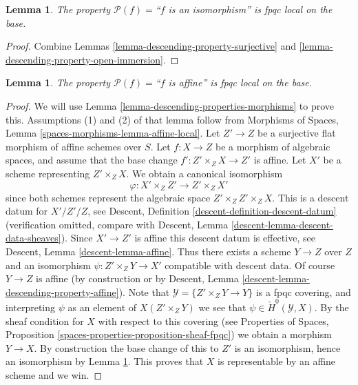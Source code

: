 \documentclass{stacks-project}
\theoremstyle{plain}
\newtheorem{lemma}[subsection]{Lemma}
\theoremstyle{definition}
\theoremstyle{remark}
\numberwithin{equation}{subsection}
\begin{document}
\begin{lemma}
\label{lemma-descending-property-isomorphism}
The property $\mathcal{P}(f) =$``$f$ is an isomorphism''
is fpqc local on the base.
\end{lemma}

\begin{proof}
Combine Lemmas \ref{lemma-descending-property-surjective}
and \ref{lemma-descending-property-open-immersion}.
\end{proof}

\begin{lemma}
\label{lemma-descending-property-affine}
The property $\mathcal{P}(f) =$``$f$ is affine''
is fpqc local on the base.
\end{lemma}

\begin{proof}
We will use
Lemma \ref{lemma-descending-properties-morphisms}
to prove this. Assumptions (1) and (2) of that lemma follow from
Morphisms of Spaces,
Lemma \ref{spaces-morphisms-lemma-affine-local}.
Let $Z' \to Z$ be a surjective flat morphism of affine schemes over $S$.
Let $f : X \to Z$ be a morphism of algebraic spaces, and assume
that the base change $f' : Z' \times_Z X \to Z'$ is affine.
Let $X'$ be a scheme representing $Z' \times_Z X$.
We obtain a canonical isomorphism
$$
\varphi : X' \times_Z Z' \longrightarrow Z' \times_Z X'
$$
since both schemes represent the algebraic space $Z' \times_Z Z' \times_Z X$.
This is a descent datum for $X'/Z'/Z$, see
Descent, Definition \ref{descent-definition-descent-datum}
(verification omitted, compare with
Descent, Lemma \ref{descent-lemma-descent-data-sheaves}).
Since $X' \to Z'$ is affine this descent datum is effective, see
Descent, Lemma \ref{descent-lemma-affine}.
Thus there exists a scheme $Y \to Z$ over $Z$ and an
isomorphism $\psi : Z' \times_Z Y \to X'$ compatible with descent data.
Of course $Y \to Z$ is affine (by construction or by
Descent, Lemma \ref{descent-lemma-descending-property-affine}).
Note that $\mathcal{Y} = \{Z' \times_Z Y \to Y\}$ is a
fpqc covering, and interpreting $\psi$ as an element of
$X(Z' \times_Z Y)$ we see that $\psi \in \check{H}^0(\mathcal{Y}, X)$.
By the sheaf condition for $X$ with respect to this covering (see
Properties of Spaces, Proposition
\ref{spaces-properties-proposition-sheaf-fpqc})
we obtain a morphism $Y \to X$.
By construction the base change of this to $Z'$ is an isomorphism, hence
an isomorphism by
Lemma \ref{lemma-descending-property-isomorphism}.
This proves that $X$ is representable by an affine scheme and we win.
\end{proof}
\end{document}
